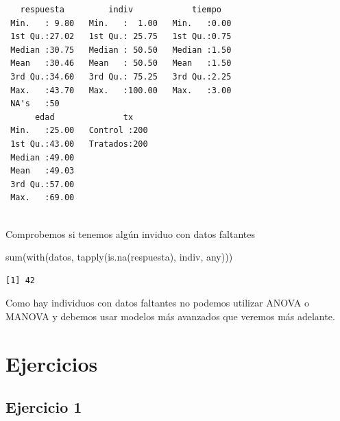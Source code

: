 \documentclass[
]{book}
\newenvironment{Shaded}{\begin{snugshade}}{\end{snugshade}}
\newcommand{\FunctionTok}[1]{\textcolor[rgb]{0.00,0.00,0.00}{#1}}
\newcommand{\NormalTok}[1]{#1}
\begin{document}
\begin{verbatim}
   respuesta         indiv            tiempo    
 Min.   : 9.80   Min.   :  1.00   Min.   :0.00  
 1st Qu.:27.02   1st Qu.: 25.75   1st Qu.:0.75  
 Median :30.75   Median : 50.50   Median :1.50  
 Mean   :30.46   Mean   : 50.50   Mean   :1.50  
 3rd Qu.:34.60   3rd Qu.: 75.25   3rd Qu.:2.25  
 Max.   :43.70   Max.   :100.00   Max.   :3.00  
 NA's   :50                                     
      edad              tx     
 Min.   :25.00   Control :200  
 1st Qu.:43.00   Tratados:200  
 Median :49.00                 
 Mean   :49.03                 
 3rd Qu.:57.00                 
 Max.   :69.00                 
                               
\end{verbatim}

Comprobemos si tenemos algún inviduo con datos faltantes

\begin{Shaded}
\begin{Highlighting}[]
\FunctionTok{sum}\NormalTok{(}\FunctionTok{with}\NormalTok{(datos, }\FunctionTok{tapply}\NormalTok{(}\FunctionTok{is.na}\NormalTok{(respuesta), indiv, any)))}
\end{Highlighting}
\end{Shaded}

\begin{verbatim}
[1] 42
\end{verbatim}

Como hay individuos con datos faltantes no podemos utilizar ANOVA o MANOVA y debemos usar modelos más avanzados que veremos más adelante.

\hypertarget{ejercicios}{%
\section{Ejercicios}\label{ejercicios}}

\hypertarget{ejercicio-1}{%
\subsection{Ejercicio 1}\label{ejercicio-1}}
\end{document}
